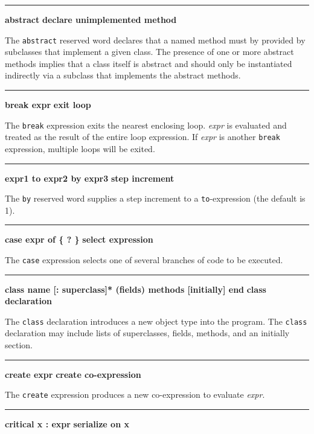 \bigskip\hrule\vspace{0.1cm}
\noindent
{\bf abstract} \hfill {\bf declare unimplemented method}

\noindent
The \texttt{abstract} reserved word declares that a
named method must by provided by subclasses that implement a given
class. The presence of one or more abstract methods implies that a
class itself is abstract and should only be instantiated indirectly
via a subclass that implements the abstract methods.


\bigskip\hrule\vspace{0.1cm}
\noindent
{\bf break expr } \hfill {\bf exit loop}

\noindent
The \texttt{break} expression exits the nearest
enclosing loop. \textit{expr} is evaluated and treated as the result of
the entire loop expression. If \textit{expr} is another
\texttt{break} expression, multiple loops will be exited.

\bigskip\hrule\vspace{0.1cm}
\noindent
{\bf expr1 to expr2 by expr3 } \hfill {\bf step increment}

\noindent
{}The \texttt{by} reserved word supplies a step
increment to a \texttt{to}{}-expression (the default is 1).

\bigskip\hrule\vspace{0.1cm}
\noindent
{\bf case expr of \{ ? \} } \hfill {\bf select expression}

\noindent
The \texttt{case} expression selects one of
several branches of code to be executed.

\bigskip\hrule\vspace{0.1cm}
\noindent
{\bf \textbf{class} name [: superclass]* (fields) methods [initially] end } \hfill {\bf class declaration}

\noindent
{}The \texttt{class} declaration introduces a new
object type into the program. The \texttt{class} declaration may
include lists of superclasses, fields, methods, and an
initially section.

\bigskip\hrule\vspace{0.1cm}
\noindent
{\bf create expr } \hfill {\bf create co{}-expression}

\noindent
{}The \texttt{create} expression produces a new
co-expression to evaluate \textit{expr}.

\bigskip\hrule\vspace{0.1cm}
\noindent
{\bf critical x : expr } \hfill {\bf serialize on x}

